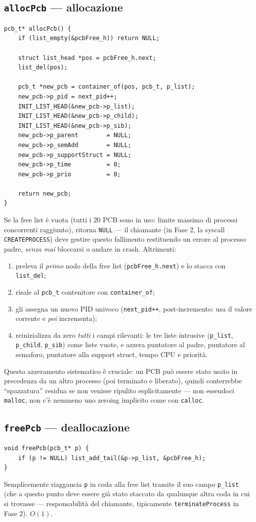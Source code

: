 \documentclass[11pt,a4paper]{article}
\newcommand{\code}[1]{\texttt{#1}}
\newcommand{\func}[1]{\textbf{\texttt{#1}}}
\begin{document}
\subsection{\func{allocPcb} --- allocazione}
\begin{lstlisting}
pcb_t* allocPcb() {
    if (list_empty(&pcbFree_h)) return NULL;

    struct list_head *pos = pcbFree_h.next;
    list_del(pos);

    pcb_t *new_pcb = container_of(pos, pcb_t, p_list);
    new_pcb->p_pid = next_pid++;
    INIT_LIST_HEAD(&new_pcb->p_list);
    INIT_LIST_HEAD(&new_pcb->p_child);
    INIT_LIST_HEAD(&new_pcb->p_sib);
    new_pcb->p_parent        = NULL;
    new_pcb->p_semAdd        = NULL;
    new_pcb->p_supportStruct = NULL;
    new_pcb->p_time          = 0;
    new_pcb->p_prio          = 0;

    return new_pcb;
}
\end{lstlisting}
Se la free list è vuota (tutti i 20 PCB sono in uso: limite massimo di
processi concorrenti raggiunto), ritorna \code{NULL} --- il chiamante (in
Fase 2, la syscall \code{CREATEPROCESS}) deve gestire questo fallimento
restituendo un errore al processo padre, \emph{senza mai} bloccarsi o andare
in crash. Altrimenti:
\begin{enumerate}
\item preleva il \emph{primo} nodo della free list (\code{pcbFree\_h.next})
  e lo stacca con \code{list\_del};
\item risale al \code{pcb\_t} contenitore con \code{container\_of};
\item gli assegna un nuovo PID univoco (\code{next\_pid++}, post-incremento:
  usa il valore corrente e \emph{poi} incrementa);
\item reinizializza da zero \emph{tutti} i campi rilevanti: le tre liste
  intrusive (\code{p\_list}, \code{p\_child}, \code{p\_sib}) come liste
  vuote, e azzera puntatore al padre, puntatore al semaforo, puntatore alla
  support struct, tempo CPU e priorità.
\end{enumerate}
Questo azzeramento sistematico è cruciale: un PCB può essere stato usato in
precedenza da un altro processo (poi terminato e liberato), quindi
conterrebbe ``spazzatura'' residua se non venisse ripulito esplicitamente ---
non essendoci \code{malloc}, non c'è nemmeno uno zeroing implicito come con
\code{calloc}.

\subsection{\func{freePcb} --- deallocazione}
\begin{lstlisting}
void freePcb(pcb_t* p) {
    if (p != NULL) list_add_tail(&p->p_list, &pcbFree_h);
}
\end{lstlisting}
Semplicemente riaggancia \code{p} in coda alla free list tramite il suo
campo \code{p\_list} (che a questo punto deve essere già stato staccato da
qualunque altra coda in cui si trovasse --- responsabilità del chiamante,
tipicamente \code{terminateProcess} in Fase 2). $O(1)$.
\end{document}

